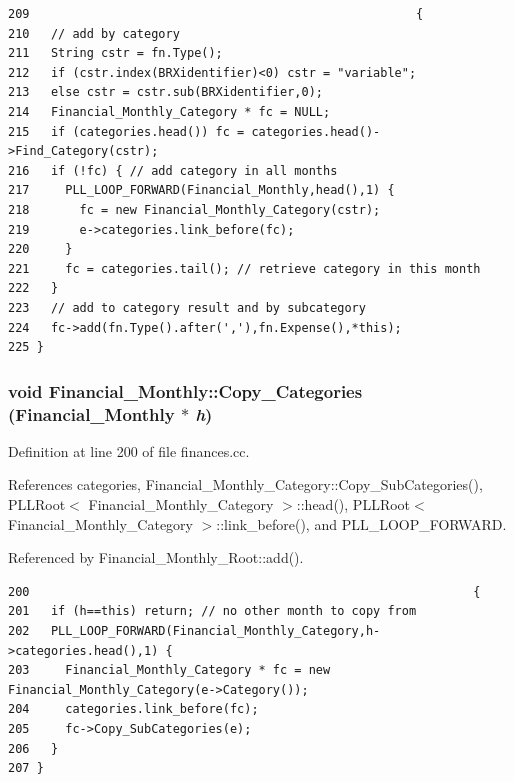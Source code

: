 \footnotesize\begin{verbatim}209                                                      {
210   // add by category
211   String cstr = fn.Type();
212   if (cstr.index(BRXidentifier)<0) cstr = "variable";
213   else cstr = cstr.sub(BRXidentifier,0);
214   Financial_Monthly_Category * fc = NULL;
215   if (categories.head()) fc = categories.head()->Find_Category(cstr);
216   if (!fc) { // add category in all months
217     PLL_LOOP_FORWARD(Financial_Monthly,head(),1) {
218       fc = new Financial_Monthly_Category(cstr);
219       e->categories.link_before(fc);
220     }
221     fc = categories.tail(); // retrieve category in this month
222   }
223   // add to category result and by subcategory
224   fc->add(fn.Type().after(','),fn.Expense(),*this);
225 }
\end{verbatim}\normalsize 
{}
\subsubsection{\setlength{\rightskip}{0pt plus 5cm}void Financial\_\-Monthly::Copy\_\-Categories (Financial\_\-Monthly $\ast$ {\em h})}\label{classFinancial__Monthly_a3}




Definition at line 200 of file finances.cc.

References categories, Financial\_\-Monthly\_\-Category::Copy\_\-Sub\-Categories(), PLLRoot$<$ Financial\_\-Monthly\_\-Category $>$::head(), PLLRoot$<$ Financial\_\-Monthly\_\-Category $>$::link\_\-before(), and PLL\_\-LOOP\_\-FORWARD.

Referenced by Financial\_\-Monthly\_\-Root::add().



\footnotesize\begin{verbatim}200                                                              {
201   if (h==this) return; // no other month to copy from
202   PLL_LOOP_FORWARD(Financial_Monthly_Category,h->categories.head(),1) {
203     Financial_Monthly_Category * fc = new Financial_Monthly_Category(e->Category());
204     categories.link_before(fc);
205     fc->Copy_SubCategories(e);
206   }
207 }
\end{verbatim}\normalsize 
{}

